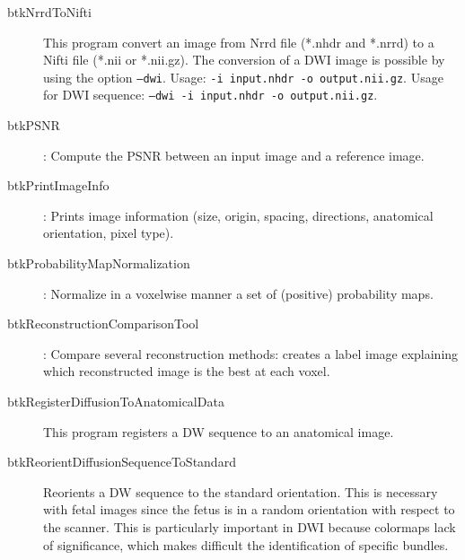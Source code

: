 \begin{description}
\item[btkNrrdToNifti] This program convert an image from Nrrd file (*.nhdr and *.nrrd) to a Nifti file (*.nii or *.nii.gz). The conversion of a DWI image is possible by using the option \texttt{--dwi}. Usage: \texttt{-i input.nhdr -o output.nii.gz}. Usage for DWI sequence: \texttt{--dwi -i input.nhdr -o output.nii.gz}.
\item[btkPSNR]: Compute the PSNR between an input image and a reference image.
\item[btkPrintImageInfo]: Prints image information (size, origin, spacing, directions, anatomical orientation, pixel type).
\item[btkProbabilityMapNormalization]: Normalize in a voxelwise manner a set of (positive) probability maps. 
\item[btkReconstructionComparisonTool]: Compare several reconstruction methods: creates a label image explaining which reconstructed image is the best at each voxel.
\item[btkRegisterDiffusionToAnatomicalData] This program registers a DW
sequence to an anatomical image. 

\item[btkReorientDiffusionSequenceToStandard] Reorients a DW sequence
to the standard orientation. This is necessary with fetal images since the fetus
is in a random orientation with respect to the scanner. This is particularly
important in DWI because colormaps lack of significance, which makes difficult
the identification of specific bundles.


\end{description}
